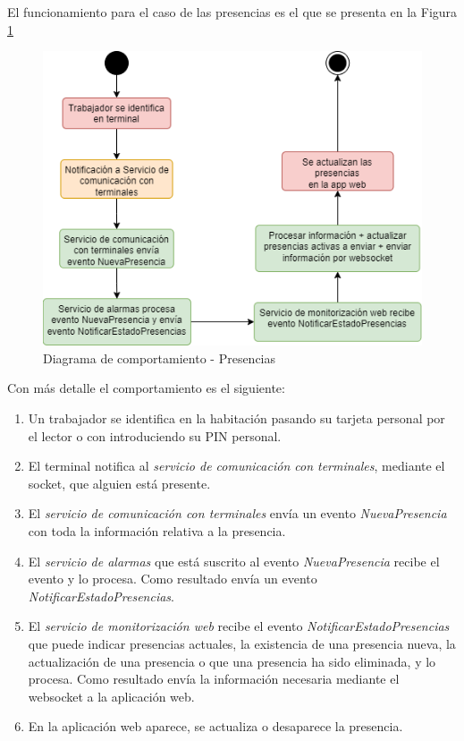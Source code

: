 \newpage
El funcionamiento para el caso de las presencias es el que se presenta en la Figura \ref{fig:flujograma-presencias}

\begin{figure}[H]
    \centering
    \includegraphics[width=12cm]{Imagenes/Flujograma-presencias.png}
    \caption{Diagrama de comportamiento - Presencias}
    \label{fig:flujograma-presencias}
\end{figure}

Con más detalle el comportamiento es el siguiente:
\begin{enumerate}
	\item Un trabajador se identifica en la habitación pasando su tarjeta personal por el lector o con introduciendo su PIN personal.
	\item El terminal notifica al \textit{servicio de comunicación con terminales}, mediante el socket, que alguien está presente.
	\item El \textit{servicio de comunicación con terminales} envía un evento \textit{NuevaPresencia} con toda la información relativa a la presencia.
	\item El \textit{servicio de alarmas} que está suscrito al evento \textit{NuevaPresencia} recibe el evento y lo procesa. Como resultado envía un evento \textit{NotificarEstadoPresencias}.
	\item El \textit{servicio de monitorización web} recibe el evento \textit{NotificarEstadoPresencias} que puede indicar presencias actuales, la existencia de una presencia nueva, la actualización de una presencia o que una presencia ha sido eliminada, y lo procesa. Como resultado envía la información necesaria mediante el websocket a la aplicación web.
	\item En la aplicación web aparece, se actualiza o desaparece la presencia.
\end{enumerate}

